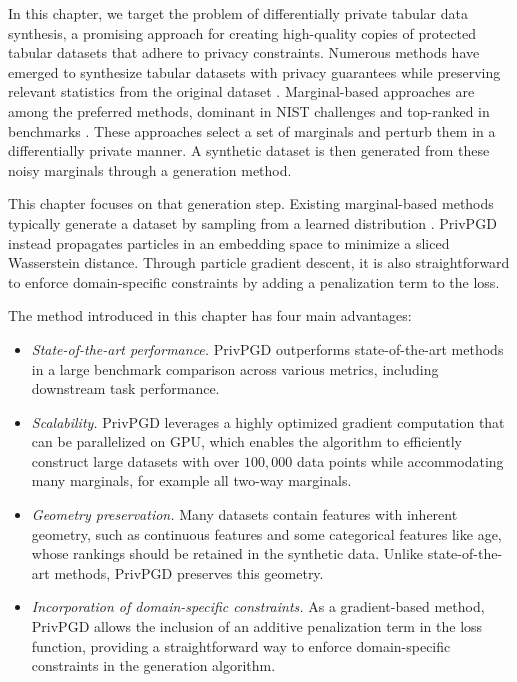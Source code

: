 In this chapter, we target the problem of differentially private tabular data synthesis, a promising approach for creating high-quality copies of protected tabular datasets that adhere to privacy constraints. Numerous methods have emerged to synthesize tabular datasets with privacy guarantees while preserving relevant statistics from the original dataset \citep{tao2021benchmarking,hu2023sok}. Marginal-based approaches are among the preferred methods, dominant in NIST challenges \citep{mst} and top-ranked in benchmarks \citep{tao2021benchmarking}. These approaches select a set of marginals and perturb them in a differentially private manner. A synthetic dataset is then generated from these noisy marginals through a generation method.

This chapter focuses on that generation step. Existing marginal-based methods typically generate a dataset by sampling from a learned distribution \citep{zhang2017privbayes,mckenna2019graphical}. PrivPGD instead propagates particles in an embedding space to minimize a sliced Wasserstein distance. Through particle gradient descent, it is also straightforward to enforce domain-specific constraints by adding a penalization term to the loss.

The method introduced in this chapter has four main advantages:
\begin{itemize}
  \item \textit{State-of-the-art performance.} PrivPGD outperforms state-of-the-art methods in a large benchmark comparison across various metrics, including downstream task performance.
  \item \textit{Scalability.} PrivPGD leverages a highly optimized gradient computation that can be parallelized on GPU, which enables the algorithm to efficiently construct large datasets with over \(100{,}000\) data points while accommodating many marginals, for example all two-way marginals.
  \item \textit{Geometry preservation.} Many datasets contain features with inherent geometry, such as continuous features and some categorical features like age, whose rankings should be retained in the synthetic data. Unlike state-of-the-art methods, PrivPGD preserves this geometry.
  \item \textit{Incorporation of domain-specific constraints.} As a gradient-based method, PrivPGD allows the inclusion of an additive penalization term in the loss function, providing a straightforward way to enforce domain-specific constraints in the generation algorithm.
\end{itemize}

